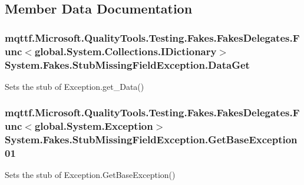 \subsection{Member Data Documentation}
\hypertarget{class_system_1_1_fakes_1_1_stub_missing_field_exception_a07c1113b3e0794ac88bc2d25145b0c9d}{
\subsubsection[{Data\-Get}]{\setlength{\rightskip}{0pt plus 5cm}mqttf.\-Microsoft.\-Quality\-Tools.\-Testing.\-Fakes.\-Fakes\-Delegates.\-Func$<$global.\-System.\-Collections.\-I\-Dictionary$>$ System.\-Fakes.\-Stub\-Missing\-Field\-Exception.\-Data\-Get}}\label{class_system_1_1_fakes_1_1_stub_missing_field_exception_a07c1113b3e0794ac88bc2d25145b0c9d}


Sets the stub of Exception.\-get\-\_\-\-Data()

\hypertarget{class_system_1_1_fakes_1_1_stub_missing_field_exception_aa981484f8033edf713722df2ee6acd3e}{
\subsubsection[{Get\-Base\-Exception01}]{\setlength{\rightskip}{0pt plus 5cm}mqttf.\-Microsoft.\-Quality\-Tools.\-Testing.\-Fakes.\-Fakes\-Delegates.\-Func$<$global.\-System.\-Exception$>$ System.\-Fakes.\-Stub\-Missing\-Field\-Exception.\-Get\-Base\-Exception01}}\label{class_system_1_1_fakes_1_1_stub_missing_field_exception_aa981484f8033edf713722df2ee6acd3e}


Sets the stub of Exception.\-Get\-Base\-Exception()

